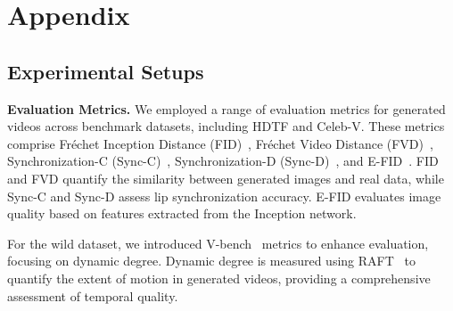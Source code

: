 \section{Appendix}

\subsection{Experimental Setups}


\noindent\textbf{Evaluation Metrics.}
We employed a range of evaluation metrics for generated videos across benchmark datasets, including HDTF and Celeb-V. 
These metrics comprise Fréchet Inception Distance (FID)~\cite{Seitzer2020FID}, Fréchet Video Distance (FVD)~\cite{unterthiner2018towards}, Synchronization-C (Sync-C)~\cite{Chung16a}, Synchronization-D (Sync-D)~\cite{Chung16a}, and E-FID~\cite{tian2024emo}. 
FID and FVD quantify the similarity between generated images and real data, while Sync-C and Sync-D assess lip synchronization accuracy. E-FID evaluates image quality based on features extracted from the Inception network.

For the wild dataset, we introduced V-bench~\cite{huang2023vbench} metrics to enhance evaluation, focusing on dynamic degree. 
Dynamic degree is measured using RAFT~\cite{teed2020raft} to quantify the extent of motion in generated videos, providing a comprehensive assessment of temporal quality.

